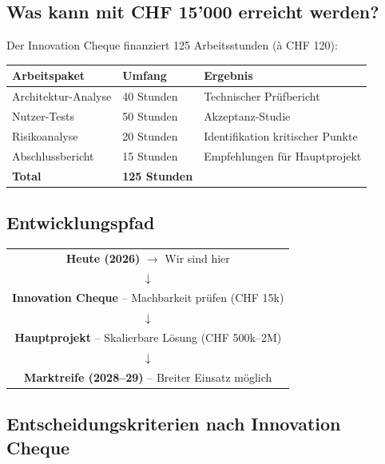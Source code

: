 \documentclass[11pt,a4paper]{article}
\begin{document}
\subsection{Was kann mit CHF 15'000 erreicht werden?}

Der Innovation Cheque finanziert 125 Arbeitsstunden (à CHF 120):

\begin{table}[h]
\centering
\begin{tabular}{@{}L{4cm}L{3cm}L{6cm}@{}}
\toprule
\textbf{Arbeitspaket} & \textbf{Umfang} & \textbf{Ergebnis} \\
\midrule
Architektur-Analyse & 40 Stunden & Technischer Prüfbericht \\
Nutzer-Tests & 50 Stunden & Akzeptanz-Studie \\
Risikoanalyse & 20 Stunden & Identifikation kritischer Punkte \\
Abschlussbericht & 15 Stunden & Empfehlungen für Hauptprojekt \\
\midrule
\textbf{Total} & \textbf{125 Stunden} & \\
\bottomrule
\end{tabular}
\end{table}

\subsection{Entwicklungspfad}

\begin{center}
\begin{tabular}{c}
\textbf{Heute (2026)} $\rightarrow$ Wir sind hier \\
$\downarrow$ \\
\textbf{Innovation Cheque} -- Machbarkeit prüfen (CHF 15k) \\
$\downarrow$ \\
\textbf{Hauptprojekt} -- Skalierbare Lösung (CHF 500k--2M) \\
$\downarrow$ \\
\textbf{Marktreife (2028--29)} -- Breiter Einsatz möglich \\
\end{tabular}
\end{center}

\subsection{Entscheidungskriterien nach Innovation Cheque}
\end{document}
